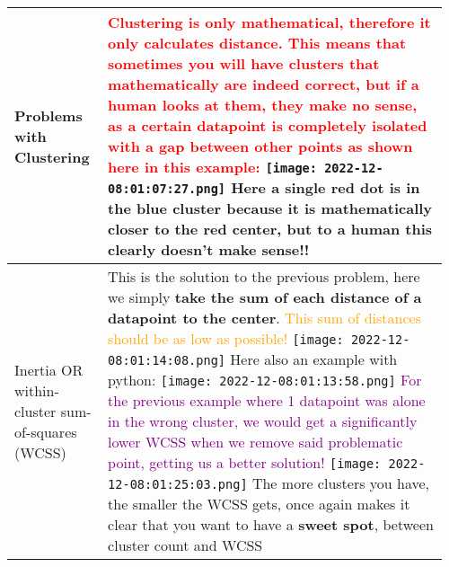 \documentclass[main.tex,fontsize=8pt,paper=a4,paper=portrait,DIV=calc,]{scrartcl}
\begin{document}
\pagebreak 
\begin{table}[ht!]
\begin{tabular}{|m{0.2\linewidth}|m{0.755\linewidth}|}
\hline
Problems with Clustering & 
\textcolor{red}{Clustering is only mathematical, therefore it only calculates distance. This means that sometimes you will have clusters that mathematically are indeed correct, but if a human looks at them, they make no sense, as a certain datapoint is completely isolated with a gap between other points as shown here in this example:}\newline
\texttt{[image: 2022-12-08:01:07:27.png]}\newline
Here a single red dot is in the blue cluster because it is mathematically closer to the red center, but to a human this clearly doesn't make sense!!
\\
\hline
Inertia OR within-cluster sum-of-squares (WCSS) & 
This is the solution to the previous problem, here we simply \textbf{take the sum of each distance of a datapoint to the center}.\newline
\textcolor{orange}{This sum of distances should be as low as possible!}\newline
\texttt{[image: 2022-12-08:01:14:08.png]}\newline
Here also an example with python:\newline
\texttt{[image: 2022-12-08:01:13:58.png]}\newline
\textcolor{purple}{For the previous example where 1 datapoint was alone in the wrong cluster, we would get a significantly lower WCSS when we remove said problematic point, getting us a better solution!}\newline
\texttt{[image: 2022-12-08:01:25:03.png]}\newline
The more clusters you have, the smaller the WCSS gets, once again makes it clear that you want to have a \textbf{sweet spot}, between cluster count and WCSS 
\\
\hline
\end{tabular}
\end{table}
\pagebreak
\end{document}
